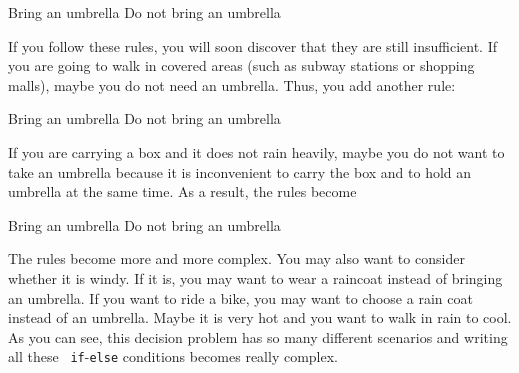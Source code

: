 \begin{algorithm}
    \begin{algorithmic}[1]
      \State Bring an umbrella
      \Else
      \State Do not bring an umbrella
      \EndIf
    \end{algorithmic}
\end{algorithm}

If you follow these rules, you will soon discover that they are still
insufficient.  If you are going to walk in covered areas (such as
subway stations or shopping malls), maybe you do not need an umbrella.
Thus, you add another rule:

\begin{algorithm}
    \begin{algorithmic}[1]
      \State Bring an umbrella
      \Else
      \State Do not bring an umbrella
      \EndIf
    \end{algorithmic}
\end{algorithm}


If you are carrying a box and it does not rain heavily, maybe you
do not want to take an umbrella because it is inconvenient to carry
the box and to hold an umbrella at the same time. As a result,
the rules become

\begin{algorithm}
    \begin{algorithmic}[1]
      \State Bring an umbrella
      \Else
      \State Do not bring an umbrella
      \EndIf
    \end{algorithmic}
\end{algorithm}

The rules become more and more complex.  You may also want to consider
whether it is windy. If it is, you may want to wear a raincoat instead
of bringing an umbrella. If you want to ride a bike, you may want to
choose a rain coat instead of an umbrella.  Maybe it is very hot and
you want to walk in rain to cool.  As you can see, this decision
problem has so many different scenarios and writing all these {\tt
  if}-{\tt else} conditions becomes really complex.

